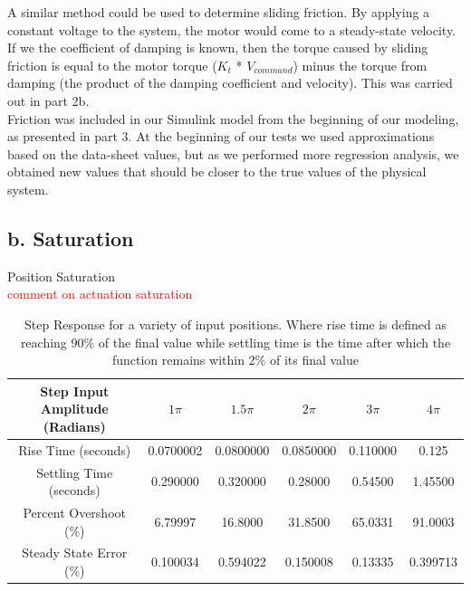 \documentclass{article}
\newcommand{\xxx}[1]{\textcolor{red}{#1}}
\theoremstyle{plain}
\theoremstyle{definition}
\theoremstyle{remark}
\begin{document}
A similar method could be used to determine sliding friction. By applying a constant voltage to the system, the motor would come to a steady-state velocity. If we the coefficient of damping is known, then the torque caused by sliding friction is equal to the motor torque ($K_{t}$ * $V_{command}$) minus the torque from damping (the product of the damping coefficient and velocity). This was carried out in part 2b.\\

Friction was included in our Simulink model from the beginning of our modeling, as presented in part 3. At the beginning of our tests we used approximations based on the data-sheet values, but as we performed more regression analysis, we obtained new values that should be closer to the true values of the physical system. \\

\subsection*{b. Saturation}

Position Saturation\\

\xxx{comment on actuation saturation}



\begin{table}[htb]
\begin{center}
    \begin{tabular}{|c|c|c|c|c|c|}
        \hline
        Step Input Amplitude (Radians) & $1\pi$   & $1.5 \pi$ & $2\pi$   & $3\pi$   & $4\pi$   \\ \hline
        Rise Time (seconds)            & 0.0700002 & 0.0800000   & 0.0850000 & 0.110000 & 0.125    \\ 
        Settling Time (seconds)        & 0.290000   & 0.320000    & 0.28000   & 0.54500  & 1.45500  \\ 
        Percent Overshoot (\%)          & 6.79997   & 16.8000     & 31.8500   & 65.0331  & 91.0003  \\ 
        Steady State Error (\%)         & 0.100034  & 0.594022    & 0.150008  & 0.13335  & 0.399713 \\
        \hline
    \end{tabular}
\end{center}
\caption{Step Response for a variety of input positions.  Where rise time is defined as reaching 90\% of the final value while settling time is the time after which the function remains within 2\% of its final value}
\label{q5_b6}
\end{table}
\end{document}
